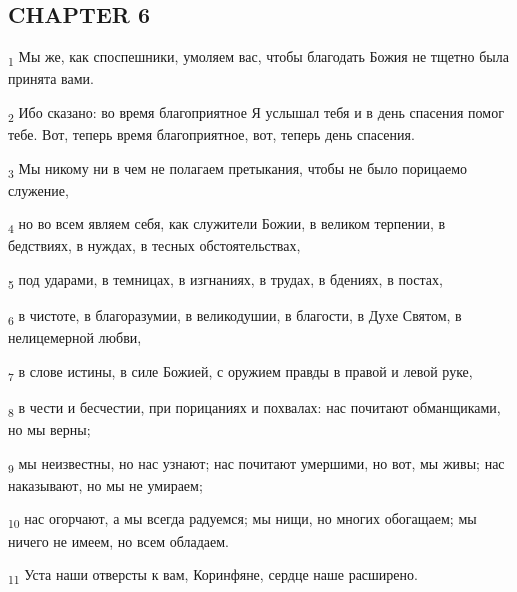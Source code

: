 \subsection{CHAPTER 6}
\begin{tcolorbox}
\textsubscript{1} Мы же, как споспешники, умоляем вас, чтобы благодать Божия не тщетно была принята вами.
\end{tcolorbox}
\begin{tcolorbox}
\textsubscript{2} Ибо сказано: во время благоприятное Я услышал тебя и в день спасения помог тебе. Вот, теперь время благоприятное, вот, теперь день спасения.
\end{tcolorbox}
\begin{tcolorbox}
\textsubscript{3} Мы никому ни в чем не полагаем претыкания, чтобы не было порицаемо служение,
\end{tcolorbox}
\begin{tcolorbox}
\textsubscript{4} но во всем являем себя, как служители Божии, в великом терпении, в бедствиях, в нуждах, в тесных обстоятельствах,
\end{tcolorbox}
\begin{tcolorbox}
\textsubscript{5} под ударами, в темницах, в изгнаниях, в трудах, в бдениях, в постах,
\end{tcolorbox}
\begin{tcolorbox}
\textsubscript{6} в чистоте, в благоразумии, в великодушии, в благости, в Духе Святом, в нелицемерной любви,
\end{tcolorbox}
\begin{tcolorbox}
\textsubscript{7} в слове истины, в силе Божией, с оружием правды в правой и левой руке,
\end{tcolorbox}
\begin{tcolorbox}
\textsubscript{8} в чести и бесчестии, при порицаниях и похвалах: нас почитают обманщиками, но мы верны;
\end{tcolorbox}
\begin{tcolorbox}
\textsubscript{9} мы неизвестны, но нас узнают; нас почитают умершими, но вот, мы живы; нас наказывают, но мы не умираем;
\end{tcolorbox}
\begin{tcolorbox}
\textsubscript{10} нас огорчают, а мы всегда радуемся; мы нищи, но многих обогащаем; мы ничего не имеем, но всем обладаем.
\end{tcolorbox}
\begin{tcolorbox}
\textsubscript{11} Уста наши отверсты к вам, Коринфяне, сердце наше расширено.
\end{tcolorbox}
